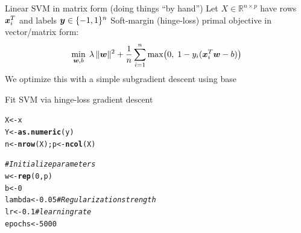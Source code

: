 \documentclass[aspectratio=169]{beamer}\usepackage[]{graphicx}\usepackage[]{xcolor}
\makeatletter
\newcommand{\hlnum}[1]{\textcolor[rgb]{0.686,0.059,0.569}{#1}}%
\newcommand{\hlcom}[1]{\textcolor[rgb]{0.678,0.584,0.686}{\textit{#1}}}%
\newcommand{\hldef}[1]{\textcolor[rgb]{0.345,0.345,0.345}{#1}}%
\newcommand{\hlkwb}[1]{\textcolor[rgb]{0.69,0.353,0.396}{#1}}%
\newcommand{\hlkwd}[1]{\textcolor[rgb]{0.737,0.353,0.396}{\textbf{#1}}}%
\newenvironment{kframe}{%
 \def\at@end@of@kframe{}%
 \ifinner\ifhmode%
  \def\at@end@of@kframe{\end{minipage}}%
  \begin{minipage}{\columnwidth}%
 \fi\fi%
 \def\FrameCommand##1{\hskip\@totalleftmargin \hskip-\fboxsep
 \colorbox{shadecolor}{##1}\hskip-\fboxsep
     \hskip-\linewidth \hskip-\@totalleftmargin \hskip\columnwidth}%
 \MakeFramed {\advance\hsize-\width
   \@totalleftmargin\z@ \linewidth\hsize
   \@setminipage}}%
 {\par\unskip\endMakeFramed%
 \at@end@of@kframe}
\newenvironment{knitrout}{}{} %
\makeatother
\begin{document}

\begin{frame}{Linear SVM in matrix form (doing things ``by hand'')}
        Let $X \in \mathbb{R}^{n\times p}$ have rows $\bm{x}_i^T$ and labels $\bm{y} \in \{-1,1\}^n$
        \vfill
        Soft-margin (hinge-loss) primal objective in vector/matrix form:
        \[
                \min_{\bm{w},b} \; \lambda\,\lVert\bm{w}\rVert^2 
                + \frac{1}{n}\sum_{i=1}^n \max\bigl(0,\; 1 - y_i(\bm{x}_i^T\bm{w} - b)\bigr)
        \]
        We optimize this with a simple subgradient descent using base 
\end{frame}

\begin{frame}[fragile]{Fit SVM via hinge-loss gradient descent}
\begin{knitrout}
\color{fgcolor}\begin{kframe}
\begin{alltt}
\hldef{X} \hlkwb{<-} \hldef{x}
\hldef{Y} \hlkwb{<-} \hlkwd{as.numeric}\hldef{(y)}
\hldef{n} \hlkwb{<-} \hlkwd{nrow}\hldef{(X); p} \hlkwb{<-} \hlkwd{ncol}\hldef{(X)}

\hlcom{# Initialize parameters}
\hldef{w} \hlkwb{<-} \hlkwd{rep}\hldef{(}\hlnum{0}\hldef{, p)}
\hldef{b} \hlkwb{<-} \hlnum{0}
\hldef{lambda} \hlkwb{<-} \hlnum{0.05}   \hlcom{# Regularization strength}
\hldef{lr} \hlkwb{<-} \hlnum{0.1}        \hlcom{# learning rate}
\hldef{epochs} \hlkwb{<-} \hlnum{5000}
\end{alltt}
\end{kframe}
\end{knitrout}
\end{frame}
\end{document}
